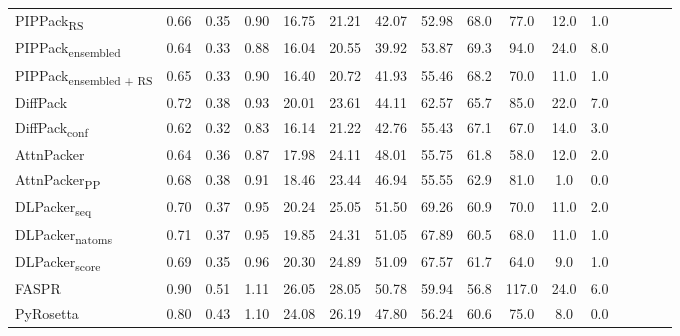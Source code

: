 \begin{table}
{\begin{tabular}{@{}lccccccccccccccc@{}}
                \textnormal{\hspace{0.5cm}PIPPack\textsubscript{RS}} & 0.66 & 0.35 & 0.90 & 16.75 & 21.21 & 42.07 & 52.98 & 68.0 & 77.0 & 12.0 & 1.0 \\
                \textnormal{\hspace{0.5cm}PIPPack\textsubscript{ensembled}} & 0.64 & 0.33 & 0.88 & 16.04 & 20.55 & 39.92 & 53.87 & 69.3 & 94.0 & 24.0 & 8.0 \\
                \textnormal{\hspace{0.5cm}PIPPack\textsubscript{ensembled + RS}} & 0.65 & 0.33 & 0.90 & 16.40 & 20.72 & 41.93 & 55.46 & 68.2 & 70.0 & 11.0 & 1.0 \\
                \textnormal{\hspace{0.5cm}DiffPack} & 0.72 & 0.38 & 0.93 & 20.01 & 23.61 & 44.11 & 62.57 & 65.7 & 85.0 & 22.0 & 7.0 \\
                \textnormal{\hspace{0.5cm}DiffPack\textsubscript{conf}} & 0.62 & 0.32 & 0.83 & 16.14 & 21.22 & 42.76 & 55.43 & 67.1 & 67.0 & 14.0 & 3.0 \\
                \textnormal{\hspace{0.5cm}AttnPacker} & 0.64 & 0.36 & 0.87 & 17.98 & 24.11 & 48.01 & 55.75 & 61.8 & 58.0 & 12.0 & 2.0 \\
                \textnormal{\hspace{0.5cm}AttnPacker\textsubscript{PP}} & 0.68 & 0.38 & 0.91 & 18.46 & 23.44 & 46.94 & 55.55 & 62.9 & 81.0 & 1.0 & 0.0 \\
                \textnormal{\hspace{0.5cm}DLPacker\textsubscript{seq}} & 0.70 & 0.37 & 0.95 & 20.24 & 25.05 & 51.50 & 69.26 & 60.9 & 70.0 & 11.0 & 2.0 \\
                \textnormal{\hspace{0.5cm}DLPacker\textsubscript{natoms}} & 0.71 & 0.37 & 0.95 & 19.85 & 24.31 & 51.05 & 67.89 & 60.5 & 68.0 & 11.0 & 1.0 \\
                \textnormal{\hspace{0.5cm}DLPacker\textsubscript{score}} & 0.69 & 0.35 & 0.96 & 20.30 & 24.89 & 51.09 & 67.57 & 61.7 & 64.0 & 9.0 & 1.0 \\
                \textnormal{\hspace{0.5cm}FASPR} & 0.90 & 0.51 & 1.11 & 26.05 & 28.05 & 50.78 & 59.94 & 56.8 & 117.0 & 24.0 & 6.0 \\
                \textnormal{\hspace{0.5cm}PyRosetta} & 0.80 & 0.43 & 1.10 & 24.08 & 26.19 & 47.80 & 56.24 & 60.6 & 75.0 & 8.0 & 0.0 \\

\end{tabular}}
\end{table}
